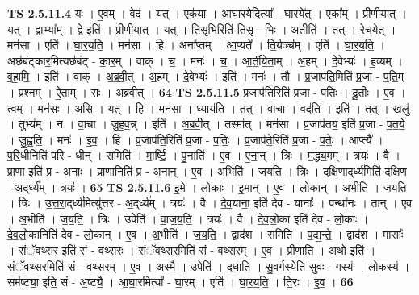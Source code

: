 \documentclass[17pt]{extarticle}
\begin{document}
                  \newline
                                \textbf{ TS 2.5.11.4} \newline
                  यः । ए॒वम् । वेद॑ । यत् । एक॑या । आ॒घा॒रये॒दित्या᳚ - घा॒रये᳚त् । एका᳚म् । प्री॒णी॒या॒त् । यत् । द्वाभ्या᳚म् । द्वे इति॑ । प्री॒णी॒या॒त् । यत् । ति॒सृभि॒रिति॑ ति॒सृ - भिः॒ । अतीति॑ । तत् । रे॒च॒ये॒त् । मन॑सा । एति॑ । घा॒र॒य॒ति॒ । मन॑सा । हि । अना᳚प्तम् । आ॒प्यते᳚ । ति॒र्यञ्च᳚म् । एति॑ । घा॒र॒य॒ति॒ । अछ॑बंट्कार॒मित्यछ॑बंट् - का॒र॒म् । वाक् । च॒ । मनः॑ । च॒ । आ॒र्ती॒ये॒ता॒म् । अ॒हम् । दे॒वेभ्यः॑ । ह॒व्यम् । व॒हा॒मि॒ । इति॑ । वाक् । अ॒ब्र॒वी॒त् । अ॒हम् । दे॒वेभ्यः॑ । इति॑ । मनः॑ । तौ । प्र॒जाप॑ति॒मिति॑ प्र॒जा - प॒ति॒म् । प्र॒श्नम् । ऐ॒ता॒म् । सः । अ॒ब्र॒वी॒त् । \textbf{  64} \newline
                  \newline
                                \textbf{ TS 2.5.11.5} \newline
                  प्र॒जाप॑ति॒रिति॑ प्र॒जा - प॒तिः॒ । दू॒तीः । ए॒व । त्वम् । मन॑सः । अ॒सि॒ । यत् । हि । मन॑सा । ध्याय॑ति । तत् । वा॒चा । वद॑ति । इति॑ । तत् । खलु॑ । तुभ्य᳚म् । न । वा॒चा । जु॒ह॒व॒न्न् । इति॑ । अ॒ब्र॒वी॒त् । तस्मा᳚त् । मन॑सा । प्र॒जाप॑तय॒ इति॑ प्र॒जा - प॒त॒ये॒ । जु॒ह्व॒ति॒ । मनः॑ । इ॒व॒ । हि । प्र॒जाप॑ति॒रिति॑ प्र॒जा - प॒तिः॒ । प्र॒जाप॑ते॒रिति॑ प्र॒जा - प॒तेः॒ । आप्त्यै᳚ । प॒रि॒धीनिति॑ परि - धीन् । समिति॑ । मा॒र्ष्टि॒ । पु॒नाति॑ । ए॒व । ए॒ना॒न् । त्रिः । म॒द्ध्य॒मम् । त्रयः॑ । वै । प्रा॒णा इति॑ प्र - अ॒नाः । प्रा॒णानिति॑ प्र - अ॒नान् । ए॒व । अ॒भिति॑ । ज॒य॒ति॒ । त्रिः । द॒क्षि॒णा॒द्‌र्ध्य॑मिति॑ दक्षिण - अ॒द्‌र्ध्य᳚म् । त्रयः॑ । \textbf{  65} \newline
                  \newline
                                \textbf{ TS 2.5.11.6} \newline
                  इ॒मे । लो॒काः । इ॒मान् । ए॒व । लो॒कान् । अ॒भीति॑ । ज॒य॒ति॒ । त्रिः । उ॒त्त॒रा॒द्‌र्ध्य॑मित्यु॑त्तर - अ॒द्‌र्ध्य᳚म् । त्रयः॑ । वै । दे॒व॒याना॒ इति॑ देव - यानाः᳚ । पन्था॑नः । तान् । ए॒व । अ॒भीति॑ । ज॒य॒ति॒ । त्रिः । उपेति॑ । वा॒ज॒य॒ति॒ । त्रयः॑ । वै । दे॒व॒लो॒का इति॑ देव - लो॒काः । दे॒व॒लो॒कानिति॑ देव - लो॒कान् । ए॒व । अ॒भीति॑ । ज॒य॒ति॒ । द्वाद॑श । समिति॑ । प॒द्य॒न्ते॒ । द्वाद॑श । मासाः᳚ । सं॒ॅव॒थ्स॒र इति॑ सं - व॒थ्स॒रः । सं॒ॅव॒थ्स॒रमिति॑ सं - व॒थ्स॒रम् । ए॒व । प्री॒णा॒ति॒ । अथो॒ इति॑ । सं॒ॅव॒थ्स॒रमिति॑ सं - व॒थ्स॒रम् । ए॒व । अ॒स्मै॒ । उपेति॑ । द॒धा॒ति॒ । सु॒व॒र्गस्येति॑ सुवः - गस्य॑ । लो॒कस्य॑ । सम॑ष्ट्या॒ इति॒ सं - अ॒ष्ट्यै॒ । आ॒घा॒रमित्या᳚ - घा॒रम् । एति॑ । घा॒र॒य॒ति॒ । ति॒रः । इ॒व॒ । \textbf{  66} \newline
\end{document}
